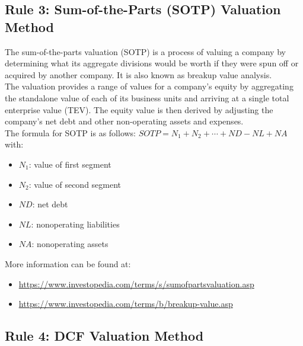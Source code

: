 \subsection{Rule 3: Sum-of-the-Parts (SOTP) Valuation Method}

The sum-of-the-parts valuation (SOTP) is a process of valuing a company by
determining what its aggregate divisions would be worth if they were spun off or
acquired by another company. It is also known as breakup value analysis.\\
The valuation provides a range of values for a company's equity by aggregating
the standalone value of each of its business units and arriving at a single
total enterprise value (TEV). The equity value is then derived by adjusting the
company's net debt and other non-operating assets and expenses.\\
The formula for SOTP is as follows: $SOTP = N_1 + N_2 + \cdots + ND - NL + NA$ with:
\begin{itemize}
    \item $N_1$: value of first segment
    \item $N_2$: value of second segment
    \item $ND$: net debt
    \item $NL$: nonoperating liabilities
    \item $NA$: nonoperating assets
\end{itemize}

More information can be found at:
\begin{itemize}
    \item \url{https://www.investopedia.com/terms/s/sumofpartsvaluation.asp}
    \item \url{https://www.investopedia.com/terms/b/breakup-value.asp}
\end{itemize}

\subsection{Rule 4: DCF Valuation Method}

